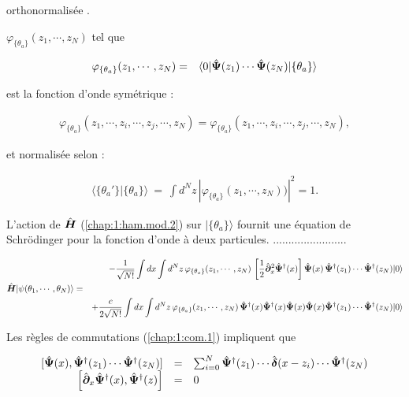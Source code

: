 orthonormalisée .


 \(\varphi_{\{\theta_a\}}(z_1, \cdots ,  z_N)\) tel que 

\begin{eqnarray}
	\varphi_{\{\theta_a\}}(z_1, \cdots ,  z_N) & = & 	\langle 0 \vert  \hat{\bm{\Psi}}(z_1) \cdots  \hat{\bm{\Psi}}(z_N)\vert  \{\theta_a\}  \rangle 
\end{eqnarray}


est la fonction d’onde symétrique :

\begin{eqnarray}
	\varphi_{\{\theta_a\}}(z_1, \cdots ,z_i , \cdots , z_j,  \cdots ,  z_N) = \varphi_{\{\theta_a\}}(z_1, \cdots ,z_i , \cdots , z_j,  \cdots ,  z_N),
\end{eqnarray}

et normalisée selon :

\begin{eqnarray}
	\langle \{\theta_a'\} \vert \{\theta_a\} \rangle ~=~ \int d^Nz\,  |\varphi_{\{\theta_a\}}(z_1, \cdots ,  z_N))|^2 = 1.
\end{eqnarray}

L’action de \(\hat{\bm{H}}\) (\ref{chap:1:ham.mod.2}) sur \(\vert \{\theta_a\} \rangle\) fournit une équation de Schrödinger pour la fonction d’onde à deux particules.
........................

\begin{eqnarray}
	& & - \frac{1}{ \sqrt{N!}} \int dx \int d^N z \, \varphi_{\{\theta_a\}}(z_1, \cdots ,  z_N) \,	\left [\frac{1}{2}\hat{\bm{\partial}}_x^2 \hat{\bm{\Psi}}^\dag(x)\right ] \hat{\bm{\Psi}}(x)\,  \hat{\bm{\Psi}}^\dag(z_1) \cdots \hat{\bm{\Psi}}^\dag(z_N) \vert 0 \rangle \label{chap:1:hal.mod.3.1}\\
	\hat{\bm{H}}\vert \psi ( \theta_1 , \cdots , \theta_N ) \rangle & = & \nonumber \\
	& & +\frac{c}{ 2\sqrt{N!}} \int dx \int d^N z \, \varphi_{\{\theta_a\}}(z_1, \cdots ,  z_N) 	\, \hat{\bm{\Psi}}^\dag(x)\hat{\bm{\Psi}}^\dag(x) \hat{\bm{\Psi}}(x)\hat{\bm{\Psi}}(x)  \hat{\bm{\Psi}}^\dag(z_1) \cdots \hat{\bm{\Psi}}^\dag(z_N) \vert 0 \rangle \label{chap:1:hal.mod.3.1} 
\end{eqnarray}

Les règles de commutations (\ref{chap:1:com.1}) impliquent que 

\begin{eqnarray}
	\left . \begin{array}{rcl}
		[ \hat{\bm{\Psi}}(x),  \hat{\bm{\Psi}}^\dag(z_1)\cdots \hat{\bm{\Psi}}^\dag(z_N)  ]  &=&  \sum_{i = 0}^{N} \hat{\bm{\Psi}}^\dag(z_1) \cdots \hat{\bm{\delta}}(x-z_i) \cdots \hat{\bm{\Psi}}^\dag(z_N)  \\
		\left [ \hat{\bm{\partial}}_x\hat{\bm{\Psi}}^\dag(x),  \hat{\bm{\Psi}}^\dag(z) \right ]   & =  & 0 
	\end{array} \right . \label{chap:1:com.2}
\end{eqnarray}


